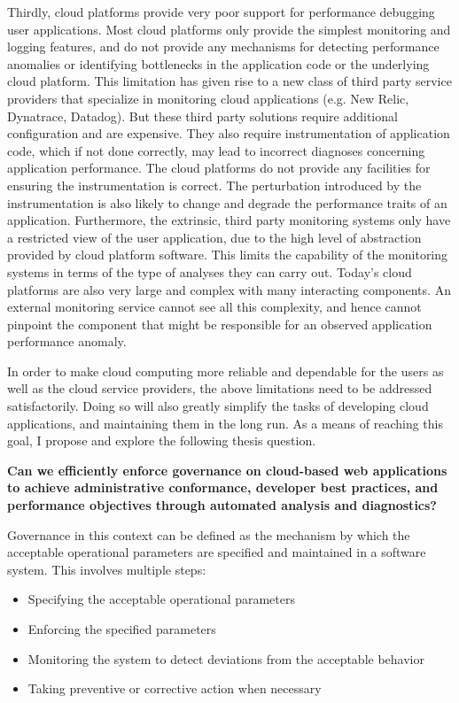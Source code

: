 Thirdly, cloud platforms provide very poor support for performance debugging
user applications. Most cloud platforms only provide the simplest monitoring and logging features,
and do not provide any mechanisms for detecting performance anomalies or identifying
bottlenecks in the application code or the underlying cloud platform. This limitation has given rise
to a new class of third party service providers that specialize in monitoring cloud applications
(e.g. New Relic, Dynatrace, Datadog). But these third party solutions require additional configuration 
and are expensive. They also require instrumentation of application code, which if not done
correctly, may lead to incorrect diagnoses concerning application performance. The cloud
platforms do not provide any facilities for ensuring the instrumentation is correct. The perturbation
introduced by the instrumentation is also likely to change and degrade the performance traits
of an application.
Furthermore, the extrinsic, third party monitoring systems only have a restricted view 
of the user application, due to the high level of abstraction provided by cloud platform software.
This limits the capability of the monitoring systems in terms of the type of analyses they can carry out.
Today's cloud platforms are also very large and complex with many interacting components.
An external monitoring service cannot see all this complexity, and hence cannot pinpoint
the component that might be responsible for an observed application performance anomaly.

In order to make cloud computing more reliable and dependable for the users as well
as the cloud service providers, the above limitations need to be addressed satisfactorily.
Doing so will also greatly simplify the tasks of developing cloud applications, and maintaining 
them in the long run. As a means of reaching this goal, I propose and explore the
following thesis question.

{\bf Can we efficiently enforce governance on cloud-based web applications to achieve 
administrative conformance, developer best practices, and performance objectives through 
automated analysis and diagnostics?} 

Governance in this context can be defined as the mechanism by which the acceptable 
operational parameters are specified and maintained in a software system. This involves 
multiple steps:
\begin{itemize}
\item Specifying the acceptable operational parameters
\item Enforcing the specified parameters
\item Monitoring the system to detect deviations from the acceptable behavior
\item Taking preventive or corrective action when necessary
\end{itemize}

